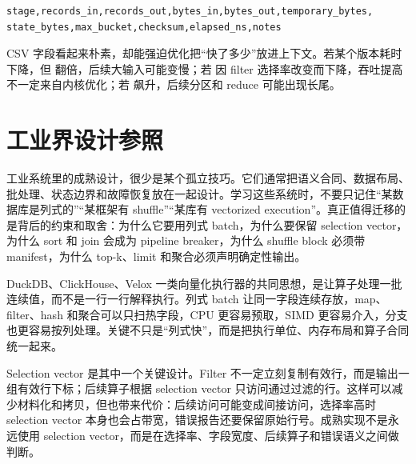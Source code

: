 \begin{lstlisting}[caption={阶段账本 CSV 的建议字段}]
stage,records_in,records_out,bytes_in,bytes_out,temporary_bytes,
state_bytes,max_bucket,checksum,elapsed_ns,notes
\end{lstlisting}

CSV 字段看起来朴素，却能强迫优化把“快了多少”放进上下文。若某个版本耗时下降，但  翻倍，后续大输入可能变慢；若  因 filter 选择率改变而下降，吞吐提高不一定来自内核优化；若  飙升，后续分区和 reduce 可能出现长尾。

\section{工业界设计参照}

工业系统里的成熟设计，很少是某个孤立技巧。它们通常把语义合同、数据布局、批处理、状态边界和故障恢复放在一起设计。学习这些系统时，不要只记住“某数据库是列式的”“某框架有 shuffle”“某库有 vectorized execution”。真正值得迁移的是背后的约束和取舍：为什么它要用列式 batch，为什么要保留 selection vector，为什么 sort 和 join 会成为 pipeline breaker，为什么 shuffle block 必须带 manifest，为什么 top-k、limit 和聚合必须声明确定性输出。

DuckDB、ClickHouse、Velox 一类向量化执行器的共同思想，是让算子处理一批连续值，而不是一行一行解释执行。列式 batch 让同一字段连续存放，map、filter、hash 和聚合可以只扫热字段，CPU 更容易预取，SIMD 更容易介入，分支也更容易按列处理。关键不只是“列式快”，而是把执行单位、内存布局和算子合同统一起来。

Selection vector 是其中一个关键设计。Filter 不一定立刻复制有效行，而是输出一组有效行下标；后续算子根据 selection vector 只访问通过过滤的行。这样可以减少材料化和拷贝，但也带来代价：后续访问可能变成间接访问，选择率高时 selection vector 本身也会占带宽，错误报告还要保留原始行号。成熟实现不是永远使用 selection vector，而是在选择率、字段宽度、后续算子和错误语义之间做判断。

